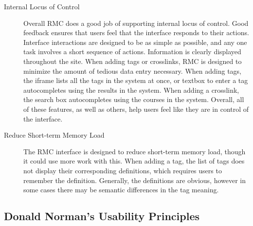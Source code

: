 \documentclass[12pt]{report}
\begin{document}
\begin{description}
\item[Internal Locus of Control] Overall RMC does a good job of supporting internal locus of control. Good feedback ensures that users feel that the interface responds to their actions.  Interface interactions are designed to be as simple as possible, and any one task involves a short sequence of actions. Information is clearly displayed throughout the site. When adding tags or crosslinks, RMC is designed to minimize the amount of tedious data entry necessary. When adding tags, the iframe lists all the tags in the system at once, or textbox to enter a tag autocompletes using the results in the system. When adding a crosslink, the search box autocompletes using the courses in the system. Overall, all of these features, as well as others, help users feel like they are in control of the interface.
\item[Reduce Short-term Memory Load] The RMC interface is designed to reduce short-term memory load, though it could use more work with this. When adding a tag, the list of tags does not display their corresponding definitions, which requires users to remember the definition. Generally, the definitions are obvious, however in some cases there may be semantic differences in the tag meaning.
\end{description}

\subsection{Donald Norman’s Usability Principles}
\end{document}

